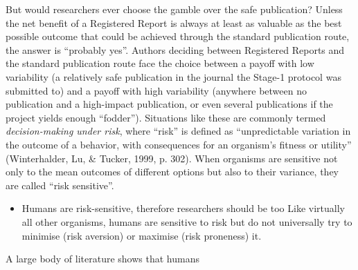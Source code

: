 \documentclass[british,,man,floatsintext]{apa6}
\providecommand{\tightlist}{%
  \setlength{\itemsep}{0pt}\setlength{\parskip}{0pt}}
\begin{document}
But would researchers ever choose the gamble over the safe publication?
Unless the net benefit of a Registered Report is always at least as valuable as the best possible outcome that could be achieved through the standard publication route, the answer is \enquote{probably yes}.
Authors deciding between Registered Reports and the standard publication route face the choice between a payoff with low variability (a relatively safe publication in the journal the Stage-1 protocol was submitted to) and a payoff with high variability (anywhere between no publication and a high-impact publication, or even several publications if the project yields enough \enquote{fodder}).
Situations like these are commonly termed \emph{decision-making under risk}, where \enquote{risk} is defined as \enquote{unpredictable variation in the outcome of a behavior, with consequences for an organism's fitness or utility} (Winterhalder, Lu, \& Tucker, 1999, p. 302).
When organisms are sensitive not only to the mean outcomes of different options but also to their variance, they are called \enquote{risk sensitive}.

\begin{itemize}
\tightlist
\item
  Humans are risk-sensitive, therefore researchers should be too
  Like virtually all other organisms, humans are sensitive to risk but do not universally try to minimise (risk aversion) or maximise (risk proneness) it.
\end{itemize}

A large body of literature shows that humans
\end{document}
